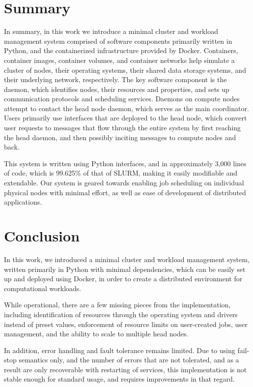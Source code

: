 \documentclass[sigconf]{acmart}
\begin{document}
\section{Summary}
In summary, in this work we introduce a minimal cluster and workload management system comprised of software components
primarily written in Python, and the containerized infrastructure provided by Docker.
Containers, container images, container volumes, and container networks help simulate a cluster of nodes, their operating
systems, their shared data storage systems, and their underlying network, respectively.
The key software component is the daemon, which identifies nodes, their resources and properties, and sets up communication
protocols and scheduling services. Daemons on compute nodes attempt to contact the head node daemon, which serves as the main
coordinator. 
Users primarily use interfaces that are deployed to the head node, which convert user requests to messages that flow through the
entire system by first reaching the head daemon, and then possibly inciting messages to compute nodes and back.

This system is written using Python interfaces, and in approximately 3,000 lines of code, which is 99.625\% of that of SLURM,
making it easily modifiable and extendable. Our system is geared towards enabling job scheduling on individual physical nodes
with minimal effort, as well as ease of development of distributed applications.

\section{Conclusion}
In this work, we introduced a minimal cluster and workload management system, written primarily in Python with minimal
dependencies, which can be easily set up and deployed using Docker, in order to create a distributed environment for
computational workloads.

While operational, there are a few missing pieces from the implementation, including identification of resources through the
operating system and drivers instead of preset values, enforcement of resource limits on user-created jobs, user management, and
the ability to scale to multiple head nodes.

In addition, error handling and fault tolerance remains limited. Due to using fail-stop semantics only, and the number of
errors that are not tolerated, and as a result are only recoverable with restarting of services, this implementation is not
stable enough for standard usage, and requires improvements in that regard.
\end{document}
